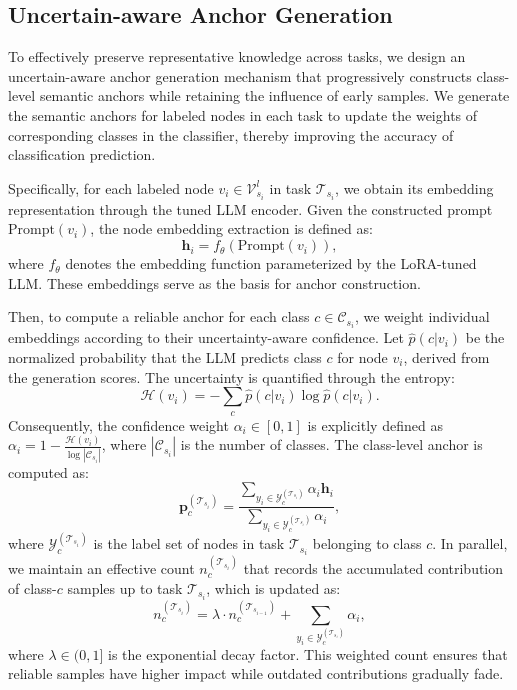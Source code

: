 \documentclass[sigconf]{acmart}
\begin{document}
\subsection{Uncertain-aware Anchor Generation}
To effectively preserve representative knowledge across tasks, we design an uncertain-aware anchor generation mechanism that progressively constructs class-level semantic anchors while retaining the influence of early samples. 
We generate the semantic anchors for labeled nodes in each task to update the weights of corresponding classes in the classifier, thereby improving the accuracy of classification prediction.

Specifically, for each labeled node $v_i \in \mathcal{V}^l_{s_i}$ in task $\mathcal{T}_{s_i}$, we obtain its embedding representation through the tuned LLM encoder. 
Given the constructed prompt $\text{Prompt}(v_i)$, the node embedding extraction is defined as:
\begin{equation}
\mathbf{h}_i = f_{\theta}\!\left(\text{Prompt}(v_i)\right),
\end{equation}
where $f_{\theta}$ denotes the embedding function parameterized by the LoRA-tuned LLM. 
These embeddings serve as the basis for anchor construction.  

Then, to compute a reliable anchor for each class $c \in \mathcal{C}_{s_i}$, we weight individual embeddings according to their uncertainty-aware confidence.
Let $\hat{p}(c|v_i)$ be the normalized probability that the LLM predicts class $c$ for node $v_i$, derived from the generation scores. 
The uncertainty is quantified through the entropy:
\begin{equation}
\mathcal{H}(v_i) = - \sum_{c} \hat{p}(c|v_i) \log \hat{p}(c|v_i).
\end{equation}
Consequently, the confidence weight $\alpha_i \in [0,1]$ is explicitly defined as $\alpha_i = 1 - \frac{\mathcal{H}(v_i)}{\log |\mathcal{C}_{s_i}|}$, where $|\mathcal{C}_{s_i}|$ is the number of classes. 
The class-level anchor is computed as:
\begin{equation}
\mathbf{p}_c^{(\mathcal{T}_{s_i})} = \frac{\sum_{y_i \in \mathcal{Y}_c^{(\mathcal{T}_{s_i})}} \alpha_i \mathbf{h}_i}{\sum_{y_i \in \mathcal{Y}_c^{(\mathcal{T}_{s_i})}} \alpha_i},
\end{equation}
where $\mathcal{Y}_c^{(\mathcal{T}_{s_i})}$ is the label set of nodes in task $\mathcal{T}_{s_i}$ belonging to class $c$. 
In parallel, we maintain an effective count $n_c^{(\mathcal{T}_{s_i})}$ that records the accumulated contribution of class-$c$ samples up to task $\mathcal{T}_{s_i}$, which is updated as:
\begin{equation}
n_c^{(\mathcal{T}_{s_i})} = \lambda \cdot n_c^{(\mathcal{T}_{s_{i-1}})} + \sum_{y_i \in \mathcal{Y}_c^{(\mathcal{T}_{s_i})}} \alpha_i,
\end{equation}
where $\lambda \in (0,1]$ is the exponential decay factor. 
This weighted count ensures that reliable samples have higher impact while outdated contributions gradually fade.  
\end{document}

